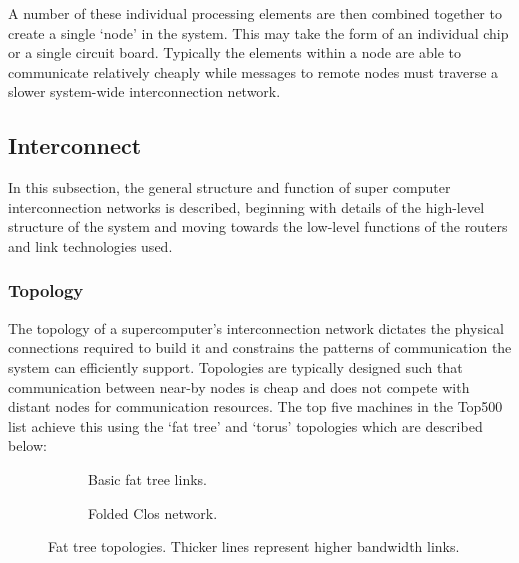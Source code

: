 			A number of these individual processing elements are then combined
			together to create a single `node' in the system. This may take the form
			of an individual chip or a single circuit board. Typically the elements
			within a node are able to communicate relatively cheaply while messages to
			remote nodes must traverse a slower system-wide interconnection network.
		
		\subsection{Interconnect}
			
			In this subsection, the general structure and function of super computer
			interconnection networks is described, beginning with details of the
			high-level structure of the system and moving towards the low-level
			functions of the routers and link technologies used.
			
			\subsubsection{Topology}
				
				
				The topology of a supercomputer's interconnection network dictates the
				physical connections required to build it and constrains the patterns of
				communication the system can efficiently support. Topologies are
				typically designed such that communication between near-by nodes is
				cheap and does not compete with distant nodes for communication
				resources. The top five machines in the Top500 list achieve this using
				the `fat tree' and `torus' topologies which are described below:
				
				\begin{figure}
					\begin{subfigure}[t]{\textwidth}
						\center
						
						\caption{Basic fat tree links.}
						\label{fig:fat-tree-concept}
					\end{subfigure}
					
					\vspace{1.5em}
					
					\begin{subfigure}[t]{\textwidth}
						\center
						
						\caption{Folded Clos network.}
						\label{fig:fat-tree-closs}
					\end{subfigure}
					
					\caption[Fat tree topologies.]{Fat tree topologies. Thicker lines
					represent higher bandwidth links.}
					\label{fig:fat-tree}
				\end{figure}
			
